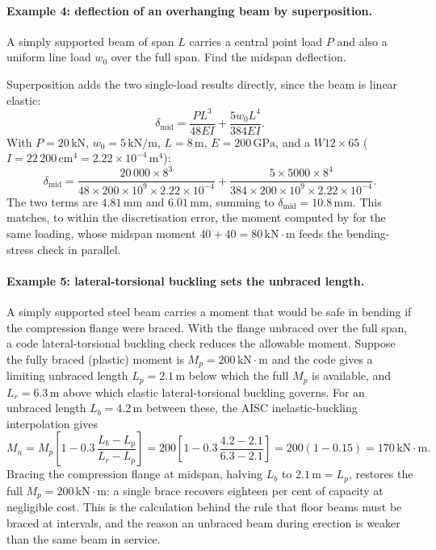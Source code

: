 \paragraph{Example 4: deflection of an overhanging beam by superposition.}
A simply supported beam of span $L$ carries a central point load $P$
and also a uniform line load $w_0$ over the full span. Find the midspan
deflection.

Superposition adds the two single-load results directly, since the
beam is linear elastic:
\[
\delta_{\text{mid}} = \frac{PL^3}{48EI} + \frac{5 w_0 L^4}{384 EI}.
\]
With $P = 20\,\text{kN}$, $w_0 = 5\,\text{kN}/\text{m}$, $L =
8\,\si{\meter}$, $E = 200\,\text{GPa}$, and a $W12\times 65$
($I = 22\,200\,\text{cm}^4 = 2.22\times 10^{-4}\,\si{\meter\tothe{4}}$):
\[
\delta_{\text{mid}} = \frac{20\,000 \times 8^3}{48 \times 200\times
10^9 \times 2.22\times 10^{-4}} + \frac{5 \times 5000 \times 8^4}
{384 \times 200\times 10^9 \times 2.22\times 10^{-4}}.
\]
The two terms are $4.81\,\si{\milli\meter}$ and $6.01\,\si{\milli
\meter}$, summing to $\delta_{\text{mid}} = 10.8\,\si{\milli\meter}$.
This matches, to within the discretisation error, the moment computed
by  for the same loading, whose midspan
moment $40 + 40 = 80\,\text{kN}\cdot\text{m}$ feeds the bending-stress
check in parallel.

\paragraph{Example 5: lateral-torsional buckling sets the unbraced length.}
A simply supported steel beam carries a moment that would be safe in
bending if the compression flange were braced. With the flange
unbraced over the full span, a code lateral-torsional buckling check
reduces the allowable moment. Suppose the fully braced (plastic)
moment is $M_p = 200\,\text{kN}\cdot\text{m}$ and the code gives a
limiting unbraced length $L_p = 2.1\,\si{\meter}$ below which the full
$M_p$ is available, and $L_r = 6.3\,\si{\meter}$ above which elastic
lateral-torsional buckling governs. For an unbraced length $L_b =
4.2\,\si{\meter}$ between these, the AISC inelastic-buckling
interpolation gives
\[
M_n = M_p\left[1 - 0.3\,\frac{L_b - L_p}{L_r - L_p}\right]
= 200\left[1 - 0.3\,\frac{4.2 - 2.1}{6.3 - 2.1}\right]
= 200(1 - 0.15) = 170\,\text{kN}\cdot\text{m}.
\]
Bracing the compression flange at midspan, halving $L_b$ to
$2.1\,\si{\meter} = L_p$, restores the full $M_p = 200\,\text{kN}\cdot
\text{m}$: a single brace recovers eighteen per cent of capacity at
negligible cost. This is the calculation behind the rule that floor
beams must be braced at intervals, and the reason an unbraced beam
during erection is weaker than the same beam in service.

